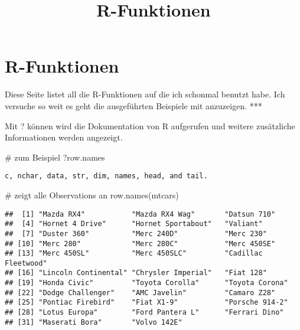 \documentclass[]{article}
\title{R-Funktionen}
\author{}
\date{}
\newenvironment{Shaded}{\begin{snugshade}}{\end{snugshade}}
\newcommand{\KeywordTok}[1]{\textcolor[rgb]{0.94,0.87,0.69}{{#1}}}
\newcommand{\CommentTok}[1]{\textcolor[rgb]{0.50,0.62,0.50}{{#1}}}
\newcommand{\NormalTok}[1]{\textcolor[rgb]{0.80,0.80,0.80}{{#1}}}
\begin{document}
\maketitle


\section{R-Funktionen}\label{r-funktionen}

Diese Seite listet all die R-Funktionen auf die ich schonmal benutzt
habe. Ich versuche so weit es geht die ausgeführten Beispiele mit
anzuzeigen. ***

Mit ? können wird die Dokumentation von R aufgerufen und weitere
zusätzliche Informationen werden angezeigt.

\begin{Shaded}
\begin{Highlighting}[]
\CommentTok{# zum Beispiel}
\NormalTok{?row.names}
\end{Highlighting}
\end{Shaded}

\begin{verbatim}
c, nchar, data, str, dim, names, head, and tail.
\end{verbatim}

\begin{Shaded}
\begin{Highlighting}[]
\CommentTok{# zeigt alle Observations an}
\KeywordTok{row.names}\NormalTok{(mtcars)}
\end{Highlighting}
\end{Shaded}

\begin{verbatim}
##  [1] "Mazda RX4"           "Mazda RX4 Wag"       "Datsun 710"         
##  [4] "Hornet 4 Drive"      "Hornet Sportabout"   "Valiant"            
##  [7] "Duster 360"          "Merc 240D"           "Merc 230"           
## [10] "Merc 280"            "Merc 280C"           "Merc 450SE"         
## [13] "Merc 450SL"          "Merc 450SLC"         "Cadillac Fleetwood" 
## [16] "Lincoln Continental" "Chrysler Imperial"   "Fiat 128"           
## [19] "Honda Civic"         "Toyota Corolla"      "Toyota Corona"      
## [22] "Dodge Challenger"    "AMC Javelin"         "Camaro Z28"         
## [25] "Pontiac Firebird"    "Fiat X1-9"           "Porsche 914-2"      
## [28] "Lotus Europa"        "Ford Pantera L"      "Ferrari Dino"       
## [31] "Maserati Bora"       "Volvo 142E"
\end{verbatim}
\end{document}
